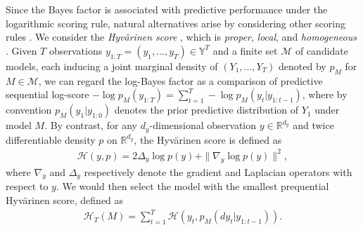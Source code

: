 \documentclass[12pt]{article}
\theoremstyle{plain}
\theoremstyle{definition}
\begin{document}
	Since the Bayes factor is associated with predictive performance under the logarithmic scoring rule,
	natural alternatives arise by considering other scoring rules \citep{dawid2015,dawid2016minimum}.
	We consider the \emph{Hyv{\"a}rinen score} \citep{hyvarinen2005}, 
	which is \textit{proper}, \textit{local}, and \textit{homogeneous}
	\citep{dawid2005,parry2012,ehm2012}. 
	Given $T$ observations $y_{1:T} = (y_1,...,y_T)\in\mathbb{Y}^T$ and a finite
	set $\mathcal{M}$ of candidate models, each inducing a joint marginal density
	of $(Y_1,...,Y_T)$ denoted by $p_M$ for $M\in\mathcal{M}$, we can regard the
	log-Bayes factor as a comparison of predictive sequential \citep[or \textit{prequential},][]{dawid1984} log-score $-\log p_M(y_{1:T}) = \sum_{t=1}^{T}-\log
	p_M(y_t|y_{1:t-1})$, where 
	by convention $p_M(y_1|y_{1:0})$ denotes the prior predictive distribution of $Y_1$ under model $M$. 
	By contrast, for any $d_y$-dimensional observation $y\in\mathbb{R}^{d_y}$ and twice differentiable density $p$ on $\mathbb{R}^{d_y}$, the Hyv{\"a}rinen score is defined as
	\begin{align}
	\mathcal{H}(y,p)= 2\Delta_y \log p(y) + \|\nabla_y \log p(y)\|^2,
	\label{eq:definitionHscore}
	\end{align}
	where $\nabla_y$ and $\Delta_y$ respectively denote the gradient and Laplacian operators with respect to $y$. 
	We would then select the model with the smallest prequential Hyv{\"a}rinen score, defined as
	\begin{align}
	\mathcal{H}_{T}(M) = \sum_{t=1}^T \mathcal{H}\left(y_t,p_M(dy_t|y_{1:t-1})\right).
	\label{eq:definitionPrequentialHscore}
	\end{align}
	
\end{document}

